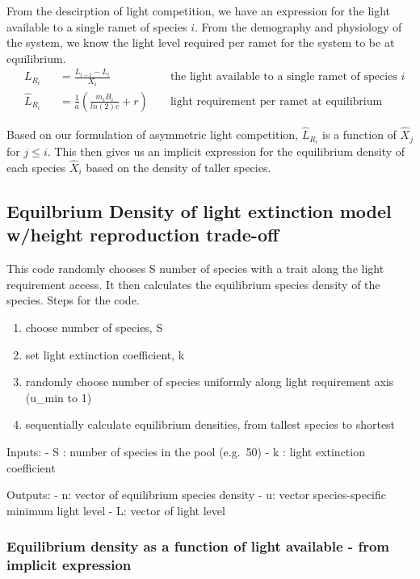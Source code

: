 \documentclass[
]{article}
\providecommand{\tightlist}{%
  \setlength{\itemsep}{0pt}\setlength{\parskip}{0pt}}
\begin{document}
From the descirption of light competition, we have an expression for the
light available to a single ramet of species \(i\). From the demography
and physiology of the system, we know the light level required per ramet
for the system to be at equilibrium. \begin{align}
& L_{R_i} &&= \frac{L_{i-1} - L_{i}}{X_i} && \text{ the light available to a single ramet of species } i \\
& \hat L_{R_i} &&= \frac{1}{a} \left( \frac{m_i B_i}{ln(2) c} + r \right) && \text{ light requirement per ramet at equilibrium}
\end{align}

Based on our formulation of asymmetric light competition,
\(\hat L_{R_i}\) is a function of \(\hat X_j\) for \(j \leq i\). This
then gives us an implicit expression for the equilibrium density of each
species \(\hat X_i\) based on the density of taller species.

\subsection{Equilbrium Density of light extinction model w/height
reproduction
trade-off}\label{equilbrium-density-of-light-extinction-model-wheight-reproduction-trade-off}

This code randomly chooses S number of species with a trait along the
light requirement access. It then calculates the equilibrium species
density of the species. Steps for the code.

\begin{enumerate}
\def\labelenumi{\arabic{enumi}.}
\tightlist
\item
  choose number of species, S
\item
  set light extinction coefficient, k
\item
  randomly choose number of species uniformly along light requirement
  axis (u\_min to 1)
\item
  sequentially calculate equilibrium densities, from tallest species to
  shortest
\end{enumerate}

Inputs: - S : number of species in the pool (e.g.~50) - k : light
extinction coefficient

Outputs: - n: vector of equilibrium species density - u: vector
species-specific minimum light level - L: vector of light level

\subsubsection{Equilibrium density as a function of light available -
from implicit
expression}\label{equilibrium-density-as-a-function-of-light-available---from-implicit-expression}
\end{document}
